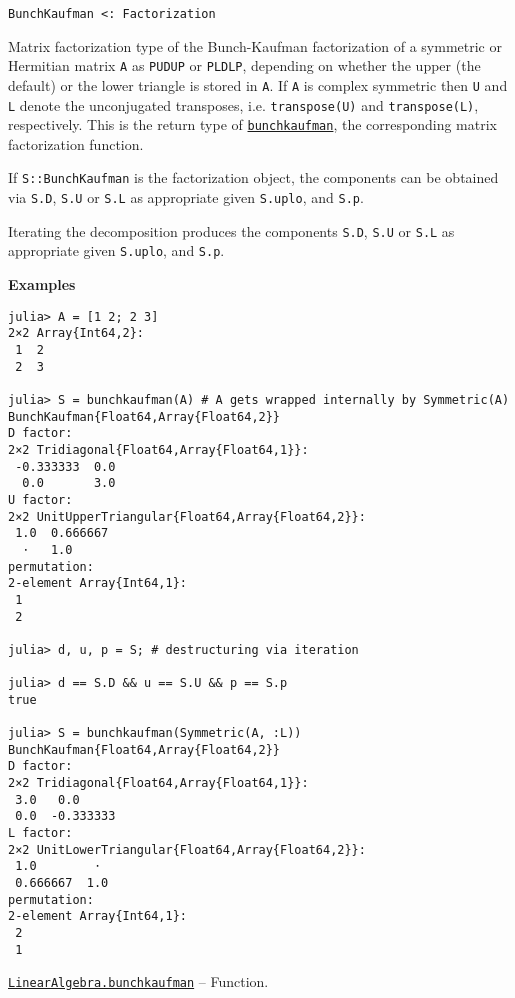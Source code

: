 \begin{adjustwidth}{2em}{0pt}


\begin{verbatim}
BunchKaufman <: Factorization
\end{verbatim}

Matrix factorization type of the Bunch-Kaufman factorization of a symmetric or Hermitian matrix \texttt{A} as \texttt{P{\textquotesingle}UDU{\textquotesingle}P} or \texttt{P{\textquotesingle}LDL{\textquotesingle}P}, depending on whether the upper (the default) or the lower triangle is stored in \texttt{A}. If \texttt{A} is complex symmetric then \texttt{U{\textquotesingle}} and \texttt{L{\textquotesingle}} denote the unconjugated transposes, i.e. \texttt{transpose(U)} and \texttt{transpose(L)}, respectively. This is the return type of \hyperlink{17253210517333433448}{\texttt{bunchkaufman}}, the corresponding matrix factorization function.

If \texttt{S::BunchKaufman} is the factorization object, the components can be obtained via \texttt{S.D}, \texttt{S.U} or \texttt{S.L} as appropriate given \texttt{S.uplo}, and \texttt{S.p}.

Iterating the decomposition produces the components \texttt{S.D}, \texttt{S.U} or \texttt{S.L} as appropriate given \texttt{S.uplo}, and \texttt{S.p}.

\textbf{Examples}


\begin{verbatim}
julia> A = [1 2; 2 3]
2×2 Array{Int64,2}:
 1  2
 2  3

julia> S = bunchkaufman(A) # A gets wrapped internally by Symmetric(A)
BunchKaufman{Float64,Array{Float64,2}}
D factor:
2×2 Tridiagonal{Float64,Array{Float64,1}}:
 -0.333333  0.0
  0.0       3.0
U factor:
2×2 UnitUpperTriangular{Float64,Array{Float64,2}}:
 1.0  0.666667
  ⋅   1.0
permutation:
2-element Array{Int64,1}:
 1
 2

julia> d, u, p = S; # destructuring via iteration

julia> d == S.D && u == S.U && p == S.p
true

julia> S = bunchkaufman(Symmetric(A, :L))
BunchKaufman{Float64,Array{Float64,2}}
D factor:
2×2 Tridiagonal{Float64,Array{Float64,1}}:
 3.0   0.0
 0.0  -0.333333
L factor:
2×2 UnitLowerTriangular{Float64,Array{Float64,2}}:
 1.0        ⋅
 0.666667  1.0
permutation:
2-element Array{Int64,1}:
 2
 1
\end{verbatim}



\end{adjustwidth}
\hypertarget{17253210517333433448}{} 
\hyperlink{17253210517333433448}{\texttt{LinearAlgebra.bunchkaufman}}  -- {Function.}


